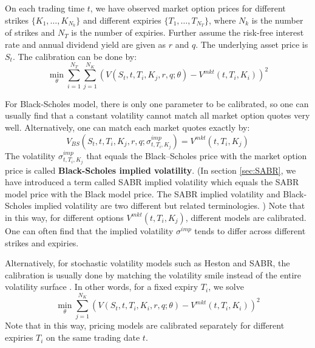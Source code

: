 \documentclass[letterpaper,12pt,titlepage,oneside,final]{book}
\numberwithin{equation}{section}
\theoremstyle{definition}
\newcommand{\Vmkt}{V^{mkt}}
\begin{document}
On each trading time $t$, we have observed market option prices for different strikes $\{K_1,\dots, K_{N_k}\}$ and different expiries $\{T_1,\dots, T_{N_T}\}$, where $N_k$ is the number of strikes and $N_T$ is the number of expiries. Further assume the risk-free interest rate and annual dividend yield are given as $r$ and $q$. The underlying asset price is $S_t$. The calibration can be done by:
\[
\min_{\theta}   \sum_{i=1}^{N_T}  \sum_{j=1}^{N_K} \left(V(S_t,t,T_i,K_j,r,q;\theta)-\Vmkt(t,T_i,K_i)\right)^2
\]

    For Black-Scholes model, there is only one parameter to be calibrated,
so one can usually find that a constant volatility cannot match all market option quotes very well. Alternatively, one can match each market quotes exactly by:
\[
V_{BS}(S_t,t,T_i,K_j,r,q;\sigma^{imp}_{t,T_i,K_j})=\Vmkt(t,T_i,K_j)
\]
The volatility $\sigma^{imp}_{t,T_i,K_j}$ that equals the Black–Scholes price with the market option price is called \textbf{Black-Scholes implied volatility}. (In section \ref{sec:SABR}, we have introduced a term called SABR implied volatility which equals the SABR model price with the Black model price. The SABR implied volatility and  Black-Scholes implied volatility are two different but related terminologies. )
Note that in this way, for different options $\Vmkt(t,T_i,K_j)$, different models are calibrated.  One can often find that the implied volatility $\sigma^{imp}$ tends to differ across different strikes and expiries.

Alternatively, for stochastic volatility models such as Heston and SABR, the calibration is usually done by matching the volatility smile instead of the entire volatility surface \cite{heston1993closed,hagan2002managing,hulloptimal}. In other words, for a fixed expiry $T_i$, we solve
\[
\min_{\theta} \sum_{j=1}^{N_K} \left(V(S_t,t,T_i,K_i,r,q;\theta)-\Vmkt(t,T_i,K_i)\right)^2
\]
Note that in this way, pricing models are calibrated separately for different expiries $T_i$  on the same trading date $t$.
\end{document}

